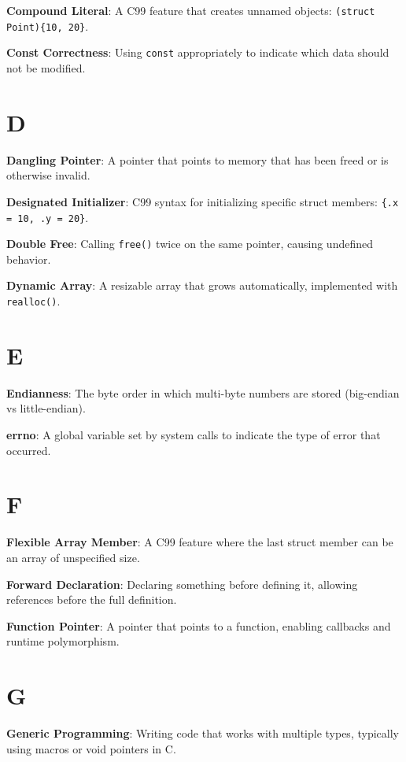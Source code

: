 \documentclass[11pt,openany]{book}
\begin{document}
\textbf{Compound Literal}: A C99 feature that creates unnamed objects: \texttt{(struct Point)\{10, 20\}}.

\textbf{Const Correctness}: Using \texttt{const} appropriately to indicate which data should not be modified.

\section*{D}

\textbf{Dangling Pointer}: A pointer that points to memory that has been freed or is otherwise invalid.

\textbf{Designated Initializer}: C99 syntax for initializing specific struct members: \texttt{\{.x = 10, .y = 20\}}.

\textbf{Double Free}: Calling \texttt{free()} twice on the same pointer, causing undefined behavior.

\textbf{Dynamic Array}: A resizable array that grows automatically, implemented with \texttt{realloc()}.

\section*{E}

\textbf{Endianness}: The byte order in which multi-byte numbers are stored (big-endian vs little-endian).

\textbf{errno}: A global variable set by system calls to indicate the type of error that occurred.

\section*{F}

\textbf{Flexible Array Member}: A C99 feature where the last struct member can be an array of unspecified size.

\textbf{Forward Declaration}: Declaring something before defining it, allowing references before the full definition.

\textbf{Function Pointer}: A pointer that points to a function, enabling callbacks and runtime polymorphism.

\section*{G}

\textbf{Generic Programming}: Writing code that works with multiple types, typically using macros or void pointers in C.
\end{document}
